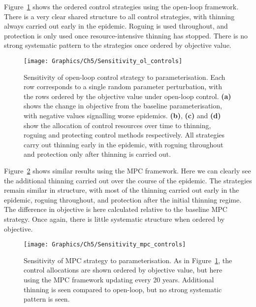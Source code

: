 Figure~\ref{fig:ch5:ol_sensitivity} shows the ordered control strategies using the open-loop framework. There is a very clear shared structure to all control strategies, with thinning always carried out early in the epidemic. Roguing is used throughout, and protection is only used once resource-intensive thinning has stopped. There is no strong systematic pattern to the strategies once ordered by objective value.

\begin{figure}
    \begin{center}
        \texttt{[image: Graphics/Ch5/Sensitivity\_ol\_controls]}
        \caption[Open-loop control parameter sensitivity]{Sensitivity of open-loop control strategy to parameterisation. Each row corresponds to a single random parameter perturbation, with the rows ordered by the objective value under open-loop control. \textbf{(a)} shows the change in objective from the baseline parameterisation, with negative values signalling worse epidemics. \textbf{(b)}, \textbf{(c)} and \textbf{(d)} show the allocation of control resources over time to thinning, roguing and protecting control methods respectively. All strategies carry out thinning early in the epidemic, with roguing throughout and protection only after thinning is carried out.\label{fig:ch5:ol_sensitivity}}
    \end{center}
\end{figure}

Figure~\ref{fig:ch5:mpc_sensitivity} shows similar results using the MPC framework. Here we can clearly see the additional thinning carried out over the course of the epidemic. The strategies remain similar in structure, with most of the thinning carried out early in the epidemic, roguing throughout, and protection after the initial thinning regime. The difference in objective is here calculated relative to the baseline MPC strategy. Once again, there is little systematic structure when ordered by objective.

\begin{figure}
    \begin{center}
        \texttt{[image: Graphics/Ch5/Sensitivity\_mpc\_controls]}
        \caption[MPC strategy parameter sensitivity]{Sensitivity of MPC strategy to parameterisation. As in Figure~\ref{fig:ch5:ol_sensitivity}, the control allocations are shown ordered by objective value, but here using the MPC framework updating every 20 years. Additional thinning is seen compared to open-loop, but no strong systematic pattern is seen.\label{fig:ch5:mpc_sensitivity}}
    \end{center}
\end{figure}

